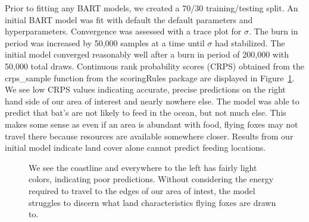 \documentclass[
  12pt,
  letterpaper,
  DIV=11,
  numbers=noendperiod]{scrartcl}
\begin{document}
Prior to fitting any BART models, we created a 70/30 training/testing
split. An initial BART model was fit with default the default parameters
and hyperparameters. Convergence was assessed with a trace plot for
\(\sigma\). The burn in period was increased by 50,000 samples at a time
until \(\sigma\) had stabilized. The initial model converged reasonably
well after a burn in period of 200,000 with 50,000 total draws.
Continuous rank probability scores (CRPS) obtained from the crps\_sample
function from the scoringRules \citep{scoringRules} package are
displayed in Figure~\ref{fig-prelim}. We see low CRPS values indicating
accurate, precise predictions on the right hand side of our area of
interest and nearly nowhere else. The model was able to predict that
bat's are not likely to feed in the ocean, but not much else. This makes
some sense as even if an area is abundant with food, flying foxes may
not travel there because resources are available somewhere closer.
Results from our initial model indicate land cover alone cannot predict
feeding locations.

\begin{figure}[H]


\caption{\label{fig-prelim}We see the coastline and everywhere to the
left has fairly light colors, indicating poor predictions. Without
considering the energy required to travel to the edges of our area of
intest, the model struggles to discern what land characteristics flying
foxes are drawn to.}

\end{figure}%
\end{document}
